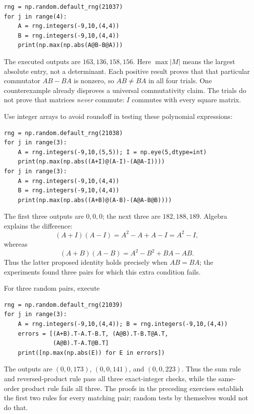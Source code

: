 \begin{verbatim}
rng = np.random.default_rng(21037)
for j in range(4):
    A = rng.integers(-9,10,(4,4))
    B = rng.integers(-9,10,(4,4))
    print(np.max(np.abs(A@B-B@A)))
\end{verbatim}
The executed outputs are $163,136,158,156$. Here $\max|M|$ means the
largest absolute entry, not a determinant. Each positive result proves that
that particular commutator $AB-BA$ is nonzero, so $AB\ne BA$ in all four
trials. One counterexample already disproves a universal commutativity
claim. The trials do not prove that matrices \emph{never} commute: $I$
commutes with every square matrix.

Use integer arrays to avoid roundoff in testing these polynomial expressions:
\begin{verbatim}
rng = np.random.default_rng(21038)
for j in range(3):
    A = rng.integers(-9,10,(5,5)); I = np.eye(5,dtype=int)
    print(np.max(np.abs((A+I)@(A-I)-(A@A-I))))
for j in range(3):
    A = rng.integers(-9,10,(4,4))
    B = rng.integers(-9,10,(4,4))
    print(np.max(np.abs((A+B)@(A-B)-(A@A-B@B))))
\end{verbatim}
The first three outputs are $0,0,0$; the next three are $182,188,189$.
Algebra explains the difference:
\[
 (A+I)(A-I)=A^2-A+A-I=A^2-I,
\]
whereas
\[
 (A+B)(A-B)=A^2-B^2+BA-AB.
\]
Thus the latter proposed identity holds precisely when $AB=BA$; the
experiments found three pairs for which this extra condition fails.

For three random pairs, execute
\begin{verbatim}
rng = np.random.default_rng(21039)
for j in range(3):
    A = rng.integers(-9,10,(4,4)); B = rng.integers(-9,10,(4,4))
    errors = [(A+B).T-A.T-B.T, (A@B).T-B.T@A.T,
              (A@B).T-A.T@B.T]
    print([np.max(np.abs(E)) for E in errors])
\end{verbatim}
The outputs are $(0,0,173)$, $(0,0,141)$, and $(0,0,223)$.
Thus the sum rule and reversed-product rule pass all three exact-integer
checks, while the same-order product rule fails all three. The proofs in
the preceding exercises establish the first two rules for every matching
pair; random tests by themselves would not do that.

